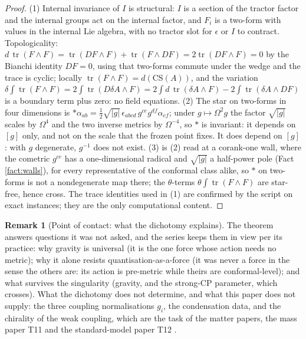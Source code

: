 \documentclass[11pt]{article}
\theoremstyle{definition}
\newtheorem{remark}[theorem]{Remark}
\newcommand{\tr}{\operatorname{tr}}
\begin{document}
\begin{proof}
(1) Internal invariance of $I$ is structural: $I$ is a section of the tractor factor and the internal groups act on the internal factor, and $F_i$ is a two-form with values in the internal Lie algebra, with no tractor slot for $\epsilon$ or $I$ to contract. Topologicality: $d\,\tr(F\wedge F) = \tr(DF\wedge F) + \tr(F\wedge DF) = 2\tr(DF\wedge F) = 0$ by the Bianchi identity $DF = 0$, using that two-forms commute under the wedge and the trace is cyclic; locally $\tr(F\wedge F) = d(\mathrm{CS}(A))$, and the variation $\delta\int\tr(F\wedge F) = 2\int\tr(D\delta A\wedge F) = 2\int d\,\tr(\delta A\wedge F) - 2\int\tr(\delta A\wedge DF)$ is a boundary term plus zero: no field equations. (2) The star on two-forms in four dimensions is $*\alpha_{ab} = \tfrac12\sqrt{|g|}\,\epsilon_{abcd}\,g^{ce}g^{df}\alpha_{ef}$; under $g \mapsto \Omega^2 g$ the factor $\sqrt{|g|}$ scales by $\Omega^4$ and the two inverse metrics by $\Omega^{-4}$, so $*$ is invariant: it depends on $[g]$ only, and not on the scale that the frozen point fixes. It does depend on $[g]$: with $g$ degenerate, $g^{-1}$ does not exist. (3) is (2) read at a corank-one wall, where the cometric $g^{ce}$ has a one-dimensional radical and $\sqrt{|g|}$ a half-power pole (Fact \ref{fact:walls}), for every representative of the conformal class alike, so $*$ on two-forms is not a nondegenerate map there; the $\theta$-terms $\theta\int\tr(F\wedge F)$ are star-free, hence cross. The trace identities used in (1) are confirmed by the script on exact instances; they are the only computational content.
\end{proof}

\begin{remark}[Point of contact: what the dichotomy explains]\label{rem:dichotomy}
The theorem answers questions it was not asked, and the series keeps them in view per its practice: why gravity is universal (it is the one force whose action needs no metric); why it alone resists quantisation-as-a-force (it was never a force in the sense the others are: its action is pre-metric while theirs are conformal-level); and what survives the singularity (gravity, and the strong-CP parameter, which crosses). What the dichotomy does not determine, and what this paper does not supply: the three coupling normalisations $g_i$, the condensation data, and the chirality of the weak coupling, which are the task of the matter papers, the mass paper T11 \cite{ButlerT11} and the standard-model paper T12 \cite{ButlerT12}.
\end{remark}
\end{document}

